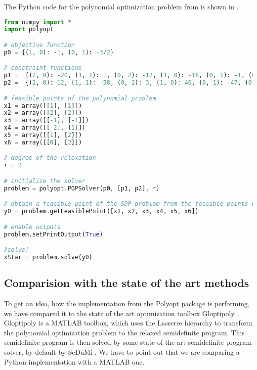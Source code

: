 \begin{example}
The Python code for the polynomial optimization problem  from  is shown in .
  \begin{lstlisting}[float, language=python, caption={Code for solving polynomial optimization problem stated in \refex{POP:opt:ex}}, labellis={POP:opt:ex}]
from numpy import *
import polyopt

# objective function
p0 = {(1, 0): -1, (0, 1): -3/2}

# constraint functions
p1 =  {(2, 0): -20, (1, 1): 1, (0, 2): -12, (1, 0): -16, (0, 1): -1, (0, 0): 48}
p2 =  {(2, 0): 12, (1, 1): -58, (0, 2): 3, (1, 0): 46, (0, 1): -47, (0, 0): 44}

# feasible points of the polynomial problem
x1 = array([[1], [1]])
x2 = array([[2], [2]])
x3 = array([[-1], [-1]])
x4 = array([[-2], [1]])
x5 = array([[1], [2]])
x6 = array([[0], [2]])

# degree of the relaxation
r = 2

# initialize the solver
problem = polyopt.POPSolver(p0, [p1, p2], r)

# obtain a feasible point of the SDP problem from the feasible points of the polynomial problem
y0 = problem.getFeasiblePoint([x1, x2, x3, x4, x5, x6])

# enable outputs
problem.setPrintOutput(True)

#solve!
xStar = problem.solve(y0)
\end{lstlisting}
\end{example}

\subsection{Comparision with the state of the art methods}


To get an idea, how the implementation from the Polyopt package is performing, we have compared it to the state of the art optimization toolbox Gloptipoly \cite{gloptipoly}.
Gloptipoly is a MATLAB toolbox, which uses the Lasserre hierarchy to transform the polynomial optimization problem to the relaxed semidefinite program.
This semidefinite program is then solved by some state of the art semidefinite program solver, by default by SeDuMi \cite{sedumi}.
We have to point out that we are comparing a Python implementation with a MATLAB one.


